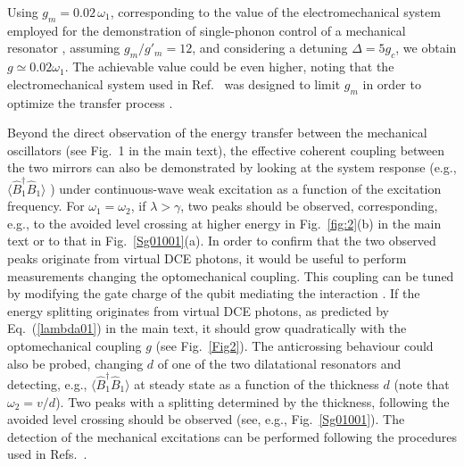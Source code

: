 \documentclass[aps,pra,twocolumn,floatfix,longbibliography, superscriptaddress]{revtex4-1}
\begin{document}
Using $g_m = 0.02\, \omega_1$, corresponding to the  value  of the electromechanical system 
employed for the demonstration of single-phonon control of a mechanical resonator \cite{OConnell2010}, assuming $g_m/g'_m =12$, and considering a  detuning $\Delta = 5 g_c$, we obtain $g \simeq 0.02 \omega_1$.
The achievable value could be even  higher, noting that  the electromechanical system used in Ref.~\cite{OConnell2010} was designed to limit $g_m$ in order to optimize the transfer process \cite{Cleland2004}.



Beyond the direct observation of the energy transfer between the mechanical oscillators (see Fig.~1 in the main text), the effective coherent coupling between the two mirrors can  also be demonstrated by looking at the system response (e.g., $\langle \hat B^\dag_1 \hat B_1 \rangle$ ) under continuous-wave weak excitation as a function of the excitation frequency. For $\omega_1 = \omega_2$, if $\lambda > \gamma$, two  peaks should be observed, corresponding, e.g.,  to the avoided level crossing at higher energy in Fig.~\ref{fig:2}(b) in the main text or to that in Fig.~\ref{Sg01001}(a). In order to confirm that the two observed peaks originate from virtual DCE photons, it would be useful to perform measurements changing the optomechanical coupling. This coupling can be tuned by modifying the gate charge of the qubit mediating the interaction \cite{Pirkkalainen2015}. If the energy splitting originates from virtual DCE photons, as predicted by Eq.~(\ref{lambda01}) in the main text, it should grow quadratically with the optomechanical coupling $g$ (see Fig.~\ref{Fig2}). The anticrossing behaviour could also be probed, changing $d$ of one of the two dilatational resonators  and detecting, e.g., $\langle \hat B^\dag_1 \hat B_1 \rangle$ at steady state as a function of the thickness $d$ (note that $\omega_2 = v/d$). Two peaks with a splitting determined by the thickness, following the avoided level crossing   should be observed (see, e.g., Fig.~\ref{Sg01001}). The detection of the mechanical excitations can be performed following the procedures used in Refs.~\cite{Cleland2004,OConnell2014}.
\newline
{}	

	
\end{document}
